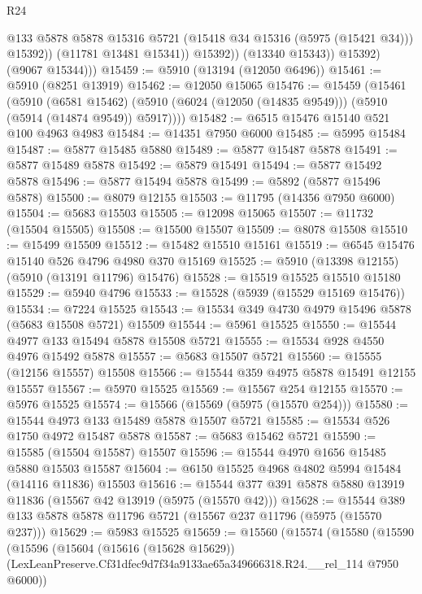 \begin{lexlean}{R24}
\begin{coremodule}
                      @133
                      @5878
                      @5878
                      @15316
                      @5721
                      (@15418 @34 @15316 (@5975 (@15421 @34)))
                      @15392))
                  (@11781 @13481 @15341))
                @15392))
            (@13340 @15343))
          @15392)
        (@9067 @15344)))
@15459 := @5910 (@13194 (@12050 @6496))
@15461 := @5910 (@8251 @13919)
@15462 := @12050 @15065
@15476 := @15459
    (@15461
      (@5910
        (@6581 @15462)
        (@5910 (@6024 (@12050 (@14835 @9549))) (@5910 (@5914 (@14874 @9549)) @5917))))
@15482 := @6515 @15476 @15140 @521 @100 @4963 @4983
@15484 := @14351 @7950 @6000
@15485 := @5995 @15484
@15487 := @5877 @15485 @5880
@15489 := @5877 @15487 @5878
@15491 := @5877 @15489 @5878
@15492 := @5879 @15491
@15494 := @5877 @15492 @5878
@15496 := @5877 @15494 @5878
@15499 := @5892 (@5877 @15496 @5878)
@15500 := @8079 @12155
@15503 := @11795 (@14356 @7950 @6000)
@15504 := @5683 @15503
@15505 := @12098 @15065
@15507 := @11732 (@15504 @15505)
@15508 := @15500 @15507
@15509 := @8078 @15508
@15510 := @15499 @15509
@15512 := @15482 @15510 @15161
@15519 := @6545 @15476 @15140 @526 @4796 @4980 @370 @15169
@15525 := @5910 (@13398 @12155) (@5910 (@13191 @11796) @15476)
@15528 := @15519 @15525 @15510 @15180
@15529 := @5940 @4796
@15533 := @15528 (@5939 (@15529 @15169 @15476))
@15534 := @7224 @15525
@15543 := @15534 @349 @4730 @4979 @15496 @5878 (@5683 @15508 @5721) @15509
@15544 := @5961 @15525
@15550 := @15544 @4977 @133 @15494 @5878 @15508 @5721
@15555 := @15534 @928 @4550 @4976 @15492 @5878
@15557 := @5683 @15507 @5721
@15560 := @15555 (@12156 @15557) @15508
@15566 := @15544 @359 @4975 @5878 @15491 @12155 @15557
@15567 := @5970 @15525
@15569 := @15567 @254 @12155
@15570 := @5976 @15525
@15574 := @15566 (@15569 (@5975 (@15570 @254)))
@15580 := @15544 @4973 @133 @15489 @5878 @15507 @5721
@15585 := @15534 @526 @1750 @4972 @15487 @5878
@15587 := @5683 @15462 @5721
@15590 := @15585 (@15504 @15587) @15507
@15596 := @15544 @4970 @1656 @15485 @5880 @15503 @15587
@15604 := @6150 @15525 @4968 @4802 @5994 @15484 (@14116 @11836) @15503
@15616 := @15544 @377 @391 @5878 @5880 @13919 @11836 (@15567 @42 @13919 (@5975 (@15570 @42)))
@15628 := @15544 @389 @133 @5878 @5878 @11796 @5721 (@15567 @237 @11796 (@5975 (@15570 @237)))
@15629 := @5983 @15525
@15659 := @15560
    (@15574
      (@15580
        (@15590
          (@15596
            (@15604
              (@15616 (@15628 @15629))
              (LexLeanPreserve.Cf31dfec9d7f34a9133ae65a349666318.R24.__rel_114 @7950 @6000))

\end{coremodule}
\end{lexlean}
